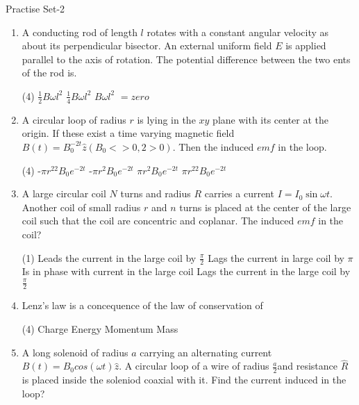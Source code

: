 \newpage
\begin{abox}
	Practise Set-2
\end{abox}
\begin{enumerate}[ label=\color{ocre}\textbf{\arabic*.}]
	\item A conducting rod of length $l$ rotates with a constant angular velocity as about its perpendicular bisector. An external uniform field $E$ is applied parallel to the axis of rotation. The potential difference  between the two ents of the rod is.
	\begin{tasks}(4)
		\task[\textbf{a.}]$\frac{1}{2}B\omega l^2$
		\task[\textbf{b.}]$\frac{1}{4}B\omega l^2$
		\task[\textbf{c.}]$B\omega l^2$
		\task[\textbf{d.}]$=zero$
	\end{tasks}
	\item A circular loop of radius $r$ is lying in the $xy$ plane with its center at the origin. If these exist a time varying magnetic field $B(t)=B_0^{-2t} \hat{z}(B_0<>0,2>0)$. Then the induced $emf$ in the loop.
	\begin{tasks}(4)
		\task[\textbf{a.}]-$\pi r^22B_0e^{-2t}$
		\task[\textbf{b.}]-$\pi r^2 B_0 e^{-2t}$
		\task[\textbf{c.}]$\pi r^2 B_0 e^{-2t}$
		\task[\textbf{d.}]$\pi r^22B_0e^{-2t}$
	\end{tasks}
	\item A large circular coil $N$ turns and radius $R$ carries a current $I=I_0\sin\omega t$. Another coil of small radius $r$ and $n$ turns is placed at the center of the large coil such that the coil are concentric and coplanar. The induced $emf$ in the coil?
	\begin{tasks}(1)
		\task[\textbf{a.}]Leads the current in the large coil by $\frac{\pi}{2}$
		\task[\textbf{b.}]Lags the current in large coil by $\pi$
		\task[\textbf{c.}]Is in phase with current in the large coil
		\task[\textbf{d.}]Lags the current in the large coil by $\frac{\pi}{2}$
	\end{tasks}
	\item Lenz's law is a concequence of the law of conservation of 
	\begin{tasks}(4)
		\task[\textbf{a.}]Charge 
		\task[\textbf{b.}]Energy 
		\task[\textbf{c.}]Momentum
		\task[\textbf{d.}]Mass
	\end{tasks}
	\item A long solenoid of radius $a$ carrying an alternating current $B(t)=B_0cos(\omega t)\hat{z}$. A circular loop of a wire of radius $\frac{a}{2}$and resistance $\hat{R}$ is placed inside the soleniod coaxial with it. Find the current induced in the loop?

\end{enumerate}
